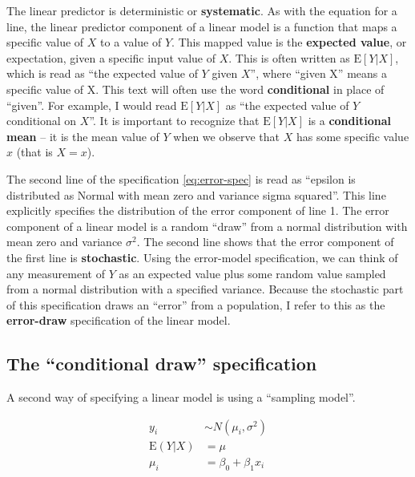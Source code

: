 \documentclass[]{book}
\begin{document}
The linear predictor is deterministic or \textbf{systematic}. As with the equation for a line, the linear predictor component of a linear model is a function that maps a specific value of \(X\) to a value of \(Y\). This mapped value is the \textbf{expected value}, or expectation, given a specific input value of \(X\). This is often written as \(\mathrm{E}[Y|X]\), which is read as ``the expected value of \(Y\) given \(X\)'', where ``given X'' means a specific value of X. This text will often use the word \textbf{conditional} in place of ``given''. For example, I would read \(\mathrm{E}[Y|X]\) as ``the expected value of \(Y\) conditional on \(X\)''. It is important to recognize that \(\mathrm{E}[Y|X]\) is a \textbf{conditional mean} -- it is the mean value of \(Y\) when we observe that \(X\) has some specific value \(x\) (that is \(X = x\)).

The second line of the specification \eqref{eq:error-spec} is read as ``epsilon is distributed as Normal with mean zero and variance sigma squared''. This line explicitly specifies the distribution of the error component of line 1. The error component of a linear model is a random ``draw'' from a normal distribution with mean zero and variance \(\sigma^2\). The second line shows that the error component of the first line is \textbf{stochastic}. Using the error-model specification, we can think of any measurement of \(Y\) as an expected value plus some random value sampled from a normal distribution with a specified variance. Because the stochastic part of this specification draws an ``error'' from a population, I refer to this as the \textbf{error-draw} specification of the linear model.

\hypertarget{the-conditional-draw-specification}{%
\subsection{The ``conditional draw'' specification}\label{the-conditional-draw-specification}}

A second way of specifying a linear model is using a ``sampling model''.

\begin{align}
y_i &\sim N(\mu_i, \sigma^2)\\
\mathrm{E}(Y|X) &= \mu\\
\mu_i &= \beta_0 + \beta_1 x_i
\label{eq:draw-spec}
\end{align}
\end{document}
